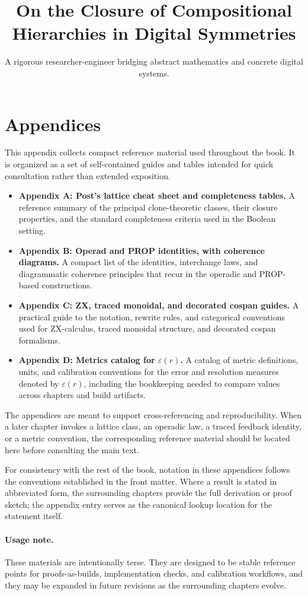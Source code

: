 \documentclass[11pt]{article}
\title{On the Closure of Compositional Hierarchies in Digital Symmetries}
\author{A rigorous researcher-engineer bridging abstract mathematics and concrete digital systems.}
\begin{document}
\section*{Appendices}

This appendix collects compact reference material used throughout the book. It is organized as a set of self-contained guides and tables intended for quick consultation rather than extended exposition.

\begin{itemize}
  \item \textbf{Appendix A: Post's lattice cheat sheet and completeness tables.} A reference summary of the principal clone-theoretic classes, their closure properties, and the standard completeness criteria used in the Boolean setting.
  \item \textbf{Appendix B: Operad and PROP identities, with coherence diagrams.} A compact list of the identities, interchange laws, and diagrammatic coherence principles that recur in the operadic and PROP-based constructions.
  \item \textbf{Appendix C: ZX, traced monoidal, and decorated cospan guides.} A practical guide to the notation, rewrite rules, and categorical conventions used for ZX-calculus, traced monoidal structure, and decorated cospan formalisms.
  \item \textbf{Appendix D: Metrics catalog for $\varepsilon(r)$.} A catalog of metric definitions, units, and calibration conventions for the error and resolution measures denoted by $\varepsilon(r)$, including the bookkeeping needed to compare values across chapters and build artifacts.
\end{itemize}

The appendices are meant to support cross-referencing and reproducibility. When a later chapter invokes a lattice class, an operadic law, a traced feedback identity, or a metric convention, the corresponding reference material should be located here before consulting the main text.

For consistency with the rest of the book, notation in these appendices follows the conventions established in the front matter. Where a result is stated in abbreviated form, the surrounding chapters provide the full derivation or proof sketch; the appendix entry serves as the canonical lookup location for the statement itself.

\paragraph{Usage note.} These materials are intentionally terse. They are designed to be stable reference points for proofs-as-builds, implementation checks, and calibration workflows, and they may be expanded in future revisions as the surrounding chapters evolve.
\end{document}
